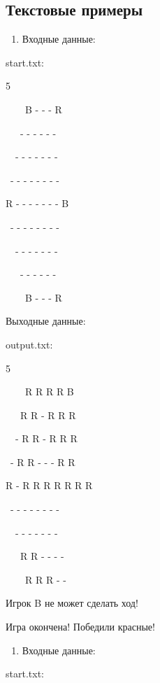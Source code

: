 \documentclass[a4paper]{article}
\begin{document}
\begin{center}
   \section{Текстовые примеры} 
\end{center}

\begin{enumerate}[series=listWWNumv,label=\texttt{\arabic*.},ref=\arabic*]
\item Входные данные:
\end{enumerate}
\foreignlanguage{english}{start.txt:}

\foreignlanguage{english}{5}

\foreignlanguage{english}{\ \ \ \ B - - - R}

\foreignlanguage{english}{\ \ \ {}- - - - - -}

\foreignlanguage{english}{\ \ {}- - - - - - - }

\foreignlanguage{english}{\ {}- - - - - - - - }

\foreignlanguage{english}{R - - - - - - - B}

\foreignlanguage{english}{\ {}- - - - - - - - }

\foreignlanguage{english}{\ \ {}- - - - - - - }

\foreignlanguage{english}{\ \ \ {}- - - - - -}

\foreignlanguage{english}{\ \ \ \ B - - - R}

Выходные данные:

output.txt:

5

\ \ \ \ R R R R B

\ \ \ R R - R R R

\ \ {}- R R - R R R

\ {}- R R - - - R R

R - R R R R R R R

\ {}- - - - - - - -

\ \ {}- - - - - - -

\ \ \ R R - - - -

\ \ \ \ R R R - -

Игрок B не может сделать ход!

Игра окончена! Победили красные!



\begin{enumerate}[resume*=listWWNumv]
\item Входные данные:
\end{enumerate}
\foreignlanguage{english}{start.txt:}
\end{document}
